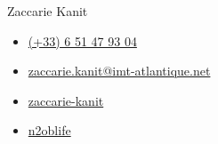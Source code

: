 \hspace*{-2mm}
\vspace{-5mm}
\begin{center}
    {\fontsize{24pt}{24pt}\selectfont Zaccarie Kanit}
\end{center}
\vspace{2mm}
\begin{itemize}[noitemsep]
    \item[\faPhone] \href{tel:+33651479304}{(+33) 6 51 47 93 04}
    \item[\faAt] \href{mailto:zaccarie.kanit@imt-atlantique.net}{zaccarie.kanit@imt-atlantique.net}
    \item[\faLinkedin] \href{https://www.linkedin.com/in/zaccarie-kanit/}{zaccarie-kanit}
    \item[\faGithub] \href{https://github.com/n2oblife}{n2oblife}
\end{itemize}
\vspace{2mm}
